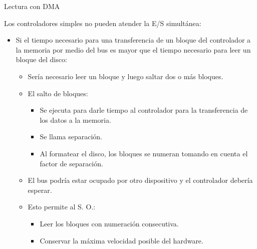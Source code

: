\documentclass{beamer}
\begin{document}
\begin{frame}{Lectura con DMA}
    
        \begin{block}{
            Los controladores simples no pueden atender la E/S simultánea:
            \pause
        }
        \begin{itemize}
            
            \item {
                 Si el tiempo necesario para una transferencia de un bloque del controlador a la memoria por medio del bus es mayor que el tiempo necesario para leer un bloque del disco:
                \pause
                \begin{itemize}
                    \item {
                        Sería necesario leer un bloque y luego saltar dos o más bloques.
                        \pause
                    }
                    \item {
                        El salto de bloques:
                        \pause
                        \begin{itemize}
                            \item {
                                Se ejecuta para darle tiempo al controlador para la transferencia de los datos a la memoria.
                                \pause
                            }
                            \item {
                                Se llama separación.
                                \pause
                            }
                            \item{
                                Al formatear el disco, los bloques se numeran tomando en cuenta el factor de separación.
                                \pause
                            }
                        \end{itemize}
                    }
                    \item {
                        El bus podría estar ocupado por otro dispositivo y el controlador debería esperar.
                        \pause
                    }
                    \item {Esto permite al S. O.: 
                        \pause
                    }
                    \begin{itemize}
                        \item {
                            Leer los bloques con numeración consecutiva.
                            \pause
                        }
                        \item {
                            Conservar la máxima velocidad posible del hardware.
        
                        }
                    \end{itemize}
                \end{itemize}
            }
            
        \end{itemize}
        \end{block}
        
\end{frame}
\end{document}
